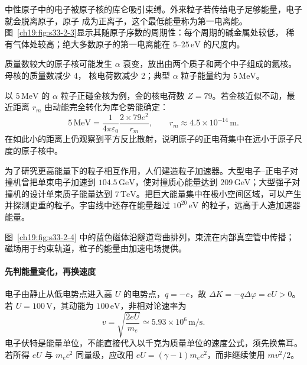 中性原子中的电子被原子核的库仑吸引束缚。外来粒子若传给电子足够能量，电子就会脱离原子，原子
成为正离子，这个最低能量称为第一电离能。图~\ref{ch19:fig:s33-2-3}显示其随原子序数的周期性：每个周期的碱金属处较低，
稀有气体处较高；绝大多数原子的第一电离能在 $5$--$25\,\mathrm{eV}$ 的尺度内。

\par\noindent\begin{minipage}{\linewidth}
\ionizationEnergyFigure
{}\label{ch19:fig:s33-2-3}
\end{minipage}\par\medskip

质量数较大的原子核可能发生 $\alpha$ 衰变，放出由两个质子和两个中子组成的氦核。母核的质量数减少 4，
核电荷数减少 2；典型 $\alpha$ 粒子能量约为 $5\,\mathrm{MeV}$。

\alphaDecayFigure

以 $5\,\mathrm{MeV}$ 的 $\alpha$ 粒子正碰金核为例，金的核电荷数 $Z=79$。若金核近似不动，最近距离
$r_m$ 由动能完全转化为库仑势能确定：
\[
  5\,\mathrm{MeV}
  =\frac{1}{4\pi\varepsilon_0}\frac{2\times79e^2}{r_m},
  \qquad r_m\approx4.5\times10^{-14}\,\mathrm m.
\]
在如此小的距离上仍观察到平方反比散射，说明原子的正电荷集中在远小于原子尺度的原子核中。

为了研究更高能量下的粒子相互作用，人们建造粒子加速器。大型电子--正电子对撞机曾把单束电子加速到
$104.5\,\mathrm{GeV}$，使对撞质心能量达到 $209\,\mathrm{GeV}$；大型强子对撞机的设计单束质子能量达到
$7\,\mathrm{TeV}$。把巨大能量集中在极小空间区域，可以产生并探测更重的粒子。宇宙线中还存在能量超过
$10^{20}\,\mathrm{eV}$ 的粒子，远高于人造加速器能量。

图~\ref{ch19:fig:s33-2-4} 中的蓝色磁体沿隧道弯曲排列，束流在内部真空管中传播；磁场用于约束轨道，粒子的能量由加速电场提供。

\par\noindent\begin{minipage}{\linewidth}
\acceleratorTunnelFigure
{}\label{ch19:fig:s33-2-4}
\end{minipage}\par\medskip


\paragraph{先判能量变化，再换速度}
电子由静止从低电势点进入高 $U$ 的电势点，$q=-e$，故
$\Delta K=-q\Delta\varphi=eU>0$。若 $U=100\,\mathrm V$，其动能为 $100\,\mathrm{eV}$，非相对论速率为
\[
 v=\sqrt{\frac{2eU}{m_e}}\simeq5.93\times10^6\,\mathrm{m/s}.
\]
电子伏特是能量单位，不能直接代入以千克为质量单位的速度公式，须先换焦耳。若所得 $eU$ 与 $m_ec^2$ 同量级，应改用 $eU=(\gamma-1)m_ec^2$，而非继续使用 $mv^2/2$。



